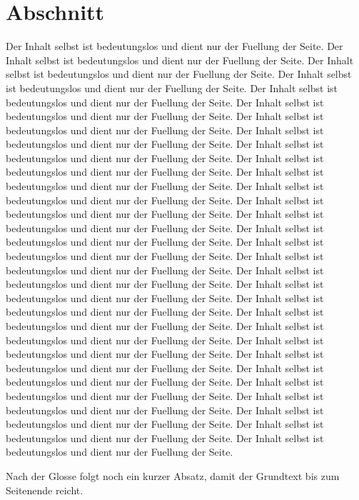 \documentclass{swisstex}
\begin{document}
\section{Abschnitt}
Der Inhalt selbst ist bedeutungslos und dient nur der Fuellung der Seite.
Der Inhalt selbst ist bedeutungslos und dient nur der Fuellung der Seite.
Der Inhalt selbst ist bedeutungslos und dient nur der Fuellung der Seite.
Der Inhalt selbst ist bedeutungslos und dient nur der Fuellung der Seite.
Der Inhalt selbst ist bedeutungslos und dient nur der Fuellung der Seite.
Der Inhalt selbst ist bedeutungslos und dient nur der Fuellung der Seite.
Der Inhalt selbst ist bedeutungslos und dient nur der Fuellung der Seite.
Der Inhalt selbst ist bedeutungslos und dient nur der Fuellung der Seite.
Der Inhalt selbst ist bedeutungslos und dient nur der Fuellung der Seite.
Der Inhalt selbst ist bedeutungslos und dient nur der Fuellung der Seite.
Der Inhalt selbst ist bedeutungslos und dient nur der Fuellung der Seite.
Der Inhalt selbst ist bedeutungslos und dient nur der Fuellung der Seite.
Der Inhalt selbst ist bedeutungslos und dient nur der Fuellung der Seite.
Der Inhalt selbst ist bedeutungslos und dient nur der Fuellung der Seite.
Der Inhalt selbst ist bedeutungslos und dient nur der Fuellung der Seite.
Der Inhalt selbst ist bedeutungslos und dient nur der Fuellung der Seite.
Der Inhalt selbst ist bedeutungslos und dient nur der Fuellung der Seite.
Der Inhalt selbst ist bedeutungslos und dient nur der Fuellung der Seite.
Der Inhalt selbst ist bedeutungslos und dient nur der Fuellung der Seite.
Der Inhalt selbst ist bedeutungslos und dient nur der Fuellung der Seite.
Der Inhalt selbst ist bedeutungslos und dient nur der Fuellung der Seite.
Der Inhalt selbst ist bedeutungslos und dient nur der Fuellung der Seite.
Der Inhalt selbst ist bedeutungslos und dient nur der Fuellung der Seite.
Der Inhalt selbst ist bedeutungslos und dient nur der Fuellung der Seite.
Der Inhalt selbst ist bedeutungslos und dient nur der Fuellung der Seite.
Der Inhalt selbst ist bedeutungslos und dient nur der Fuellung der Seite.
Der Inhalt selbst ist bedeutungslos und dient nur der Fuellung der Seite.
Der Inhalt selbst ist bedeutungslos und dient nur der Fuellung der Seite.
Der Inhalt selbst ist bedeutungslos und dient nur der Fuellung der Seite.
Der Inhalt selbst ist bedeutungslos und dient nur der Fuellung der Seite.

Nach der Glosse folgt noch ein kurzer Absatz, damit der Grundtext bis zum
Seitenende reicht.
\end{document}
